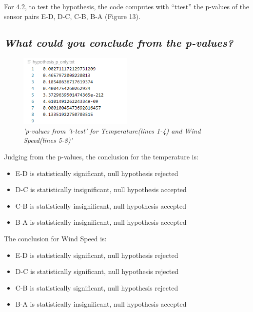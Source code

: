 \documentclass[a4paper,12pt]{article} %
\begin{document}
For 4.2, to test the hypothesis, the code computes with “ttest” the p-values of
the sensor pairs E-D, D-C, C-B, B-A (Figure 13). 




\subsection{\it What could you conclude from the p-values?}



\begin{figure}[H]
\centering
\includegraphics[width=0.5\textwidth]{Graphs/Pvalues_95pr_ttest_TEMP_WS.PNG}
\caption{\it'p-values from 't-test' for Temperature(lines 1-4) and Wind Speed(lines 5-8)'}
\end{figure}




Judging from the p-values, the conclusion for the temperature is:

\begin{itemize}

\item{E-D is statistically significant, null hypothesis rejected}


\item{D-C is statistically insignificant, null hypothesis accepted}


\item{C-B is statistically insignificant, null hypothesis accepted}


\item{B-A is statistically insignificant, null hypothesis accepted}

\end{itemize}

The conclusion for Wind Speed is:

\begin{itemize}

\item{E-D is statistically significant, null hypothesis rejected}


\item{D-C is statistically significant, null hypothesis rejected}


\item{C-B is statistically significant, null hypothesis rejected}


\item{B-A is statistically insignificant, null hypothesis accepted}

\end{itemize}
\end{document}
